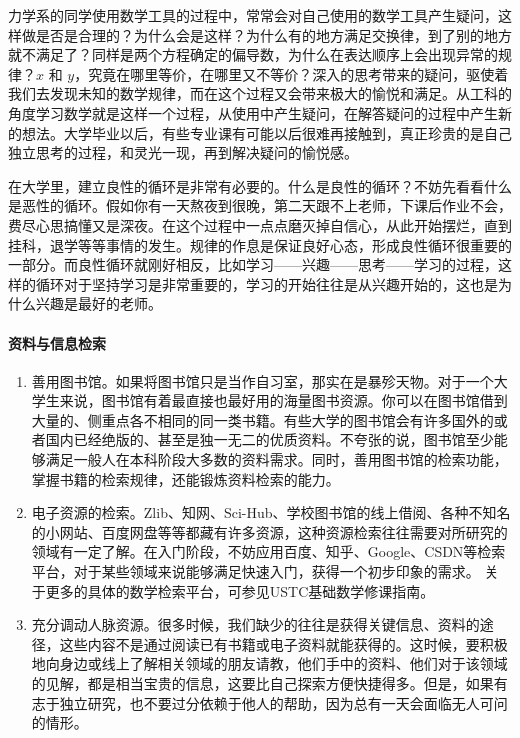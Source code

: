 力学系的同学使用数学工具的过程中，常常会对自己使用的数学工具产生疑问，这样做是否是合理的？为什么会是这样？为什么有的地方满足交换律，到了别的地方就不满足了？同样是两个方程确定的偏导数，为什么在表达顺序上会出现异常的规律？$x$ 和 $y$，究竟在哪里等价，在哪里又不等价？深入的思考带来的疑问，驱使着我们去发现未知的数学规律，而在这个过程又会带来极大的愉悦和满足。从工科的角度学习数学就是这样一个过程，从使用中产生疑问，在解答疑问的过程中产生新的想法。大学毕业以后，有些专业课有可能以后很难再接触到，真正珍贵的是自己独立思考的过程，和灵光一现，再到解决疑问的愉悦感。

在大学里，建立良性的循环是非常有必要的。什么是良性的循环？不妨先看看什么是恶性的循环。假如你有一天熬夜到很晚，第二天跟不上老师，下课后作业不会，费尽心思搞懂又是深夜。在这个过程中一点点磨灭掉自信心，从此开始摆烂，直到挂科，退学等等事情的发生。规律的作息是保证良好心态，形成良性循环很重要的一部分。而良性循环就刚好相反，比如学习——兴趣——思考——学习的过程，这样的循环对于坚持学习是非常重要的，学习的开始往往是从兴趣开始的，这也是为什么兴趣是最好的老师。

\paragraph{资料与信息检索}

\begin{enumerate}
    \item 善用图书馆。如果将图书馆只是当作自习室，那实在是暴殄天物。对于一个大学生来说，图书馆有着最直接也最好用的海量图书资源。你可以在图书馆借到大量的、侧重点各不相同的同一类书籍。有些大学的图书馆会有许多国外的或者国内已经绝版的、甚至是独一无二的优质资料。不夸张的说，图书馆至少能够满足一般人在本科阶段大多数的资料需求。同时，善用图书馆的检索功能，掌握书籍的检索规律，还能锻炼资料检索的能力。
    \item 电子资源的检索。Zlib、知网、Sci-Hub、学校图书馆的线上借阅、各种不知名的小网站、百度网盘等等都藏有许多资源，这种资源检索往往需要对所研究的领域有一定了解。在入门阶段，不妨应用百度、知乎、Google、CSDN等检索平台，对于某些领域来说能够满足快速入门，获得一个初步印象的需求。
          关于更多的具体的数学检索平台，可参见USTC基础数学修课指南。
    \item 充分调动人脉资源。很多时候，我们缺少的往往是获得关键信息、资料的途径，这些内容不是通过阅读已有书籍或电子资料就能获得的。这时候，要积极地向身边或线上了解相关领域的朋友请教，他们手中的资料、他们对于该领域的见解，都是相当宝贵的信息，这要比自己探索方便快捷得多。但是，如果有志于独立研究，也不要过分依赖于他人的帮助，因为总有一天会面临无人可问的情形。
\end{enumerate}


